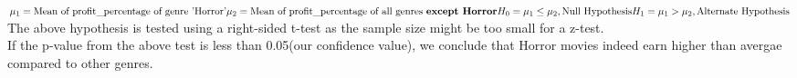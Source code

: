 \documentclass{beamer}
\begin{document}
\begin{frame}
\begin{tcolorbox}[colback=purple!5,colframe=blue!75!black,title=Example of a Hypothesis]
	\begin{math}
	 \mu_1  = \text{Mean of profit\_percentage of genre 'Horror'} \\
	 \mu_2  = \text{Mean of profit\_percentage of all genres \textbf{except Horror}}\\
		H_0   =  \mu_1\leq\mu_2 , \text{Null Hypothesis} \\ 
		H_1   =  \mu_1>\mu_2 , \text{Alternate Hypothesis} \\
	\end{math}
	 \tcblower
	 The above hypothesis is tested using a right-sided t-test as the 
	 sample size might be too small for a z-test.\\
	 If the p-value from the above test
	 is less than 0.05(our confidence value), we conclude that Horror movies indeed
	 earn higher than avergae compared to other genres.

\end{tcolorbox} 



\end{frame}
\begin{frame}

\begin{tcolorbox}[colback=purple!5,colframe=blue!75!black,title=Bootsrapped Hypothesis Testing]

\end{tcolorbox}	
\end{frame}
\begin{frame}
\printbibliography

\end{frame}
\end{document}
